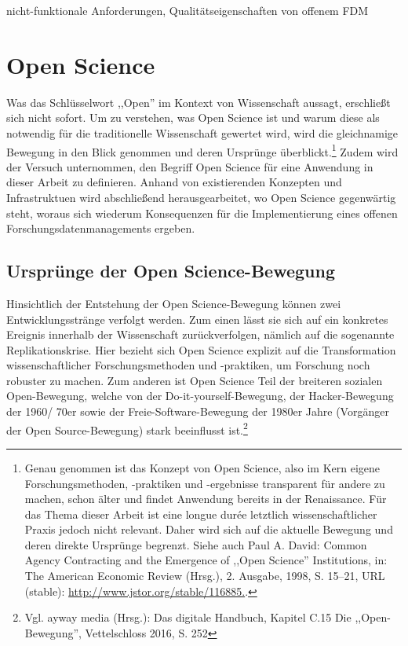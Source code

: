 \onehalfspacing
nicht-funktionale Anforderungen, Qualitätseigenschaften von offenem FDM

\section{Open Science}

Was das Schlüsselwort ,,Open'' im Kontext von Wissenschaft aussagt, erschließt sich nicht sofort. Um zu verstehen, was Open Science ist und warum diese als notwendig für die traditionelle Wissenschaft gewertet wird, wird die gleichnamige Bewegung in den Blick genommen und deren Ursprünge überblickt.\footnote{Genau genommen ist das Konzept von Open Science, also im Kern eigene Forschungsmethoden,  -praktiken und -ergebnisse transparent für andere zu machen, schon älter und findet Anwendung bereits in der Renaissance. Für das Thema dieser Arbeit ist eine longue durée letztlich wissenschaftlicher Praxis jedoch nicht relevant. Daher wird sich auf die aktuelle Bewegung und deren direkte Ursprünge begrenzt. Siehe auch Paul A. David: Common Agency Contracting and the Emergence of ,,Open Science'' Institutions, in: The American Economic Review (Hrsg.), 2. Ausgabe, 1998, S. 15–21, URL (stable): \url{http://www.jstor.org/stable/116885.}.} Zudem wird der Versuch unternommen, den Begriff Open Science für eine Anwendung in dieser Arbeit zu definieren. Anhand von existierenden Konzepten und Infrastruktuen wird abschließend herausgearbeitet, wo Open Science gegenwärtig steht, woraus sich wiederum Konsequenzen für die Implementierung eines offenen Forschungsdatenmanagements ergeben. 

\subsection{Ursprünge der Open Science-Bewegung}

Hinsichtlich der Entstehung der Open Science-Bewegung können zwei Entwicklungsstränge verfolgt werden. Zum einen lässt sie sich auf ein konkretes Ereignis innerhalb der Wissenschaft zurückverfolgen, nämlich auf die sogenannte Replikationskrise. Hier bezieht sich Open Science explizit auf die Transformation wissenschaftlicher Forschungsmethoden und -praktiken, um Forschung noch robuster zu machen. Zum anderen ist Open Science Teil der breiteren sozialen Open-Bewegung, welche von der Do-it-yourself-Bewegung, der Hacker-Bewegung der 1960/ 70er sowie der Freie-Software-Bewegung der 1980er Jahre
(Vorgänger der Open Source-Bewegung) stark beeinflusst ist.\footnote{Vgl. ayway media (Hrsg.): Das digitale Handbuch,
Kapitel C.15 Die ,,Open-Bewegung'', Vettelschloss 2016, S. 252}

